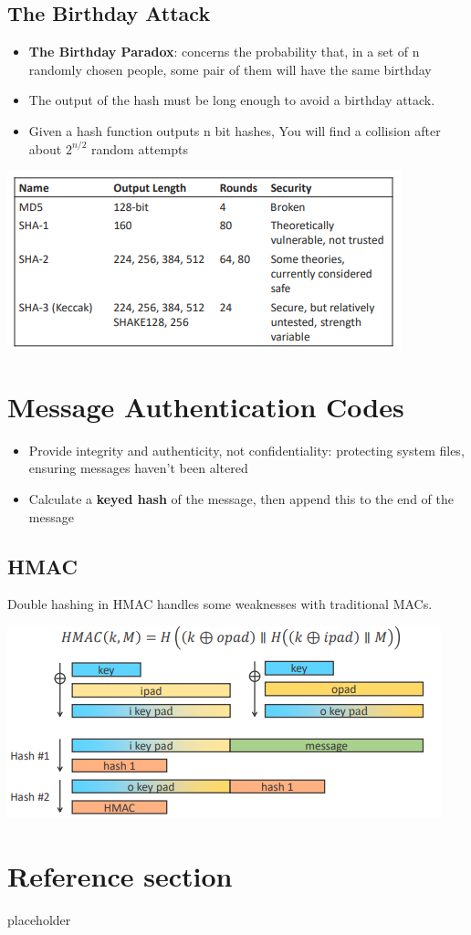 \documentclass{article}
\begin{document}
\subsection{The Birthday Attack}
\begin{itemize}
  \item \textbf{The Birthday Paradox}: concerns the probability that, in a set of n randomly chosen people, some pair of them will have the same birthday
  \item The output of the hash must be long enough to avoid a birthday attack.
  \item Given a hash function outputs n bit hashes, You will find a collision after about $ 2^{n/2}$ random attempts
\end{itemize}
\begin{center}
  \includegraphics{hash_examples.png}
\end{center}

\section{Message Authentication Codes}
\begin{itemize}
  \item Provide integrity and authenticity, not confidentiality: protecting system files, ensuring messages haven’t been altered 
  \item Calculate a \textbf{keyed hash} of the message, then append this to the end of the message
\end{itemize}

\subsection{HMAC}
\begin{flushleft}
Double hashing in HMAC handles some weaknesses with traditional MACs.
\end{flushleft}
\begin{center}
  \includegraphics{hmac.png}
\end{center}

\pagebreak
\section*{Reference section} \label{sec:reference}
\begin{description}
	\item[placeholder] \hfill \\
\end{description}
\end{document}
